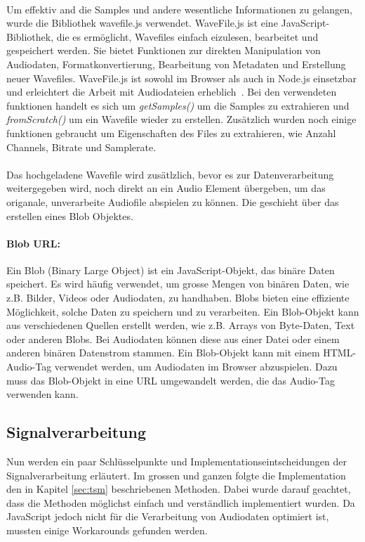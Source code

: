 \paragraph{}
Um effektiv and die Samples und andere wesentliche Informationen zu gelangen, wurde die Bibliothek wavefile.js verwendet. WaveFile.js ist eine JavaScript-Bibliothek, die es ermöglicht, Wavefiles einfach eizulesen, bearbeitet und gespeichert werden. Sie bietet Funktionen zur direkten Manipulation von Audiodaten, Formatkonvertierung, Bearbeitung von Metadaten und Erstellung neuer Wavefiles. WaveFile.js ist sowohl im Browser als auch in Node.js einsetzbar und erleichtert die Arbeit mit Audiodateien erheblich~\cite{wavefilejs}. Bei den verwendeten funktionen handelt es sich um \textit{getSamples()} um die Samples zu extrahieren und \textit{fromScratch()} um ein Wavefile wieder zu erstellen. Zusätzlich wurden noch einige funktionen gebraucht um Eigenschaften des Files zu extrahieren, wie Anzahl Channels, Bitrate und Samplerate. 

\paragraph{}
Das hochgeladene Wavefile wird zusätlzlich, bevor es zur Datenverarbeitung weitergegeben wird, noch direkt an ein Audio Element übergeben, um das origanale, unverarbeite Audiofile abspielen zu können. Die geschieht über das erstellen eines Blob Objektes. 

\paragraph{Blob URL:}
Ein Blob (Binary Large Object) ist ein JavaScript-Objekt, das binäre Daten speichert. Es wird häufig verwendet, um grosse Mengen von binären Daten, wie z.B. Bilder, Videos oder Audiodaten, zu handhaben. Blobs bieten eine effiziente Möglichkeit, solche Daten zu speichern und zu verarbeiten. Ein Blob-Objekt kann aus verschiedenen Quellen erstellt werden, wie z.B. Arrays von Byte-Daten, Text oder anderen Blobs\cite{blob_audio_js}. Bei Audiodaten können diese aus einer Datei oder einem anderen binären Datenstrom stammen. Ein Blob-Objekt kann mit einem HTML-Audio-Tag verwendet werden, um Audiodaten im Browser abzuspielen. Dazu muss das Blob-Objekt in eine URL umgewandelt werden, die das Audio-Tag verwenden kann.

\subsection{Signalverarbeitung}
\label{sec:signalverarbeitung}
Nun werden ein paar Schlüsselpunkte und Implementationseintscheidungen der Signalverarbeitung erläutert. Im grossen und ganzen folgte die Implementation den in Kapitel \ref{sec:tsm} beschriebenen Methoden. Dabei wurde darauf geachtet, dass die Methoden möglichst einfach und verständlich implementiert wurden. Da JavaScript jedoch nicht für die Verarbeitung von Audiodaten optimiert ist, mussten einige Workarounds gefunden werden. 

